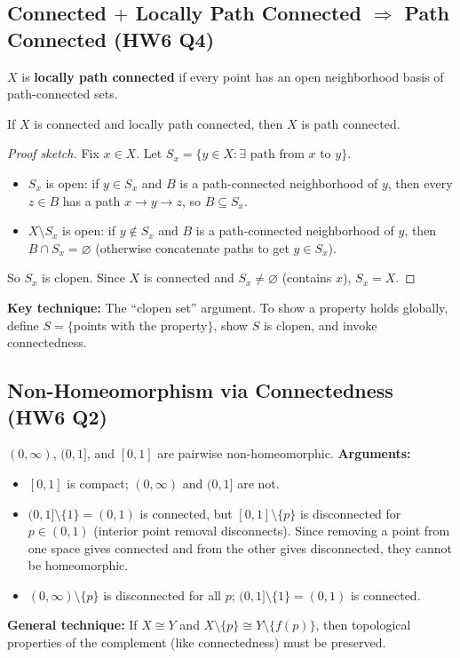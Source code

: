 \documentclass{article}
\begin{document}
\subsection{Connected $+$ Locally Path Connected $\Rightarrow$ Path
Connected (HW6 Q4)}
\begin{definition}
  $X$ is \textbf{locally path connected} if every point has an open
  neighborhood basis of path-connected sets.
\end{definition}

\begin{theorem}
  If $X$ is connected and locally path connected, then $X$ is path connected.
\end{theorem}
\begin{proof}[Proof sketch]
  Fix $x \in X$. Let $S_x = \{y \in X : \exists\text{ path from } x
  \text{ to } y\}$.
  \begin{itemize}
    \item $S_x$ is open: if $y \in S_x$ and $B$ is a path-connected
      neighborhood of $y$, then every $z \in B$ has a path $x \to y
      \to z$, so $B \subseteq S_x$.
    \item $X \setminus S_x$ is open: if $y \notin S_x$ and $B$ is a
      path-connected neighborhood of $y$, then $B \cap S_x =
      \varnothing$ (otherwise concatenate paths to get $y \in S_x$).
  \end{itemize}
  So $S_x$ is clopen. Since $X$ is connected and $S_x \ne
  \varnothing$ (contains $x$), $S_x = X$.
\end{proof}
\textbf{Key technique:} The ``clopen set'' argument. To show a
property holds globally, define $S = \{$points with the property$\}$,
show $S$ is clopen, and invoke connectedness.

\subsection{Non-Homeomorphism via Connectedness (HW6 Q2)}
$(0,\infty)$, $(0,1]$, and $[0,1]$ are pairwise non-homeomorphic.
\textbf{Arguments:}
\begin{itemize}
  \item $[0,1]$ is compact; $(0,\infty)$ and $(0,1]$ are not.
  \item $(0,1] \setminus \{1\} = (0,1)$ is connected, but $[0,1]
    \setminus \{p\}$ is disconnected for $p \in (0,1)$ (interior
    point removal disconnects). Since removing a point from one space
    gives connected and from the other gives disconnected, they
    cannot be homeomorphic.
  \item $(0,\infty) \setminus \{p\}$ is disconnected for all $p$;
    $(0,1] \setminus \{1\} = (0,1)$ is connected.
\end{itemize}
\textbf{General technique:} If $X \cong Y$ and $X \setminus \{p\}
\cong Y \setminus \{f(p)\}$, then topological properties of the
complement (like connectedness) must be preserved.
\end{document}
